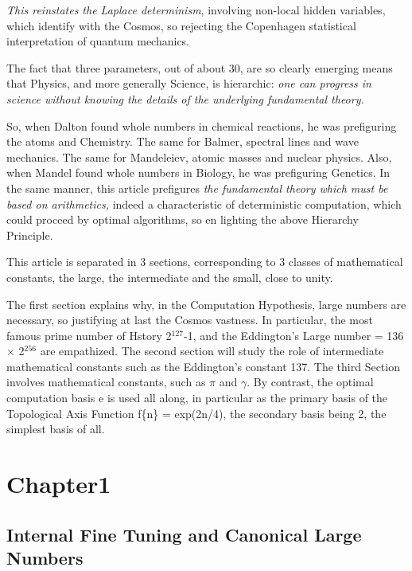 \documentclass[twoside,draft]{article}
\begin{document}
\begin{sloppypar}
{\textit{This reinstates the Laplace determinism}, involving non-local hidden variables, which identify with the Cosmos, so rejecting the Copenhagen statistical interpretation of quantum mechanics.

The fact that three parameters, out of about 30, are so clearly emerging means that Physics, and more generally Science, is hierarchic: \textit{one can progress in science without knowing the details of the underlying fundamental theory.}

So, when Dalton found whole numbers in chemical reactions, he was prefiguring the atoms and Chemistry. The same for Balmer, spectral lines and wave mechanics. The same for Mandeleiev, atomic masses and nuclear physics. Also, when Mandel found whole numbers in Biology, he was prefiguring Genetics. In the same manner, this article prefigures \textit{the fundamental theory which must be based on arithmetics,} indeed a characteristic of deterministic computation, which could proceed by optimal algorithms, so en lighting the above Hierarchy Principle.

This article is separated in 3 sections, corresponding to 3 classes of mathematical constants, the large, the intermediate and the small, close to unity.

The first section explains why, in the Computation Hypothesis, large numbers are necessary, so justifying at last the Cosmos vastness. In particular,  the most famous prime number of Hstory 2$^{127}\!$-1, and the Eddington's Large number = 136 $\times$ 2$^{256}\!$  are empathized. The second section will study the role of intermediate mathematical constants such as the Eddington's constant 137. The third Section involves mathematical constants, such as $\pi$ and $\gamma$.  By contrast, the optimal computation basis e is used all along, in particular as the primary basis of the Topological Axis Function f\{n\} = exp(2n/4), the secondary basis being 2, the simplest basis of all.

\section {Chapter1}
\subsection {Internal Fine Tuning and Canonical Large Numbers}

}
\end{sloppypar}
\end{document}
